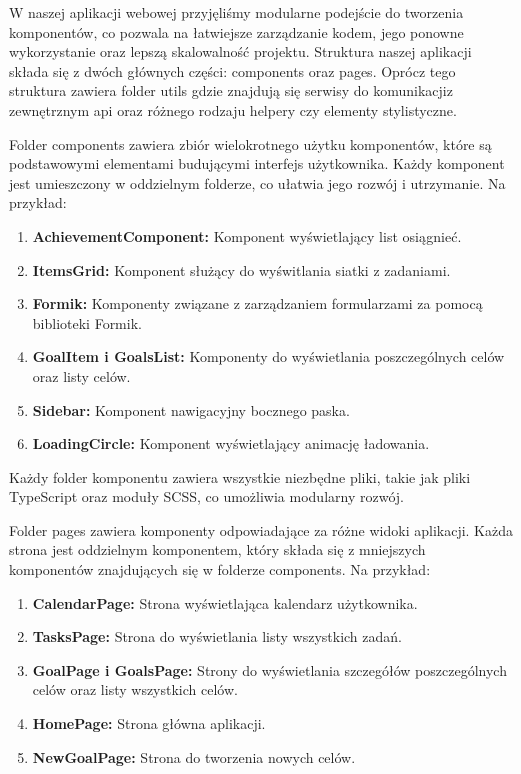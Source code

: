 \noindent W naszej aplikacji webowej przyjęliśmy modularne podejście do tworzenia komponentów, co pozwala na łatwiejsze zarządzanie kodem, jego ponowne wykorzystanie oraz lepszą skalowalność projektu. Struktura naszej aplikacji składa się z dwóch głównych części: components oraz pages. Oprócz tego struktura zawiera folder utils gdzie znajdują się serwisy do komunikacji\linebreak z zewnętrznym api oraz różnego rodzaju helpery czy elementy stylistyczne.


\noindent Folder components zawiera zbiór wielokrotnego użytku komponentów, które są podstawowymi elementami budującymi interfejs użytkownika. Każdy komponent jest umieszczony w oddzielnym folderze, co ułatwia jego rozwój i utrzymanie. Na przykład:
\begin{enumerate}
    \item {\bf AchievementComponent:} Komponent wyświetlający list osiągnieć.
    \item {\bf ItemsGrid:} Komponent służący do wyświtlania siatki z zadaniami.
    \item {\bf Formik:} Komponenty związane z zarządzaniem formularzami za pomocą biblioteki Formik.
    \item {\bf GoalItem i GoalsList:} Komponenty do wyświetlania poszczególnych celów oraz listy celów.
    \item {\bf Sidebar:} Komponent nawigacyjny bocznego paska.
    \item {\bf LoadingCircle:} Komponent wyświetlający animację ładowania.
\end{enumerate}
\noindent Każdy folder komponentu zawiera wszystkie niezbędne pliki, takie jak pliki TypeScript oraz moduły SCSS, co umożliwia modularny rozwój.
\\


\noindent Folder pages zawiera komponenty odpowiadające za różne widoki aplikacji. Każda strona jest oddzielnym komponentem, który składa się z mniejszych komponentów znajdujących się w folderze components. Na przykład:
\begin{enumerate}
    \item {\bf CalendarPage:} Strona wyświetlająca kalendarz użytkownika.
    \item {\bf TasksPage:} Strona do wyświetlania  listy wszystkich zadań.
    \item {\bf GoalPage i GoalsPage:} Strony do wyświetlania szczegółów poszczególnych celów oraz listy wszystkich celów.
    \item {\bf HomePage:} Strona główna aplikacji.
    \item {\bf NewGoalPage:} Strona do tworzenia nowych celów.
\end{enumerate}

